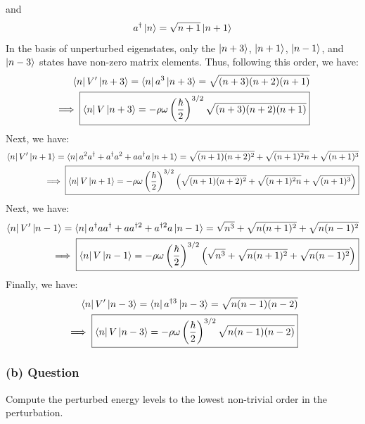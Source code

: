 \documentclass{article}
\begin{document}
and
\begin{equation}
    a^\dagger\ket{n} = \sqrt{n+1}\ket{n+1}
\end{equation}
In the basis of unperturbed eigenstates, only the $\ket{n+3}$, $\ket{n+1}$, $\ket{n-1}$, and $\ket{n-3}$ states have non-zero matrix elements. Thus, following this order, we have:
\begin{align}
    \bra{n}V'\ket{n+3} = \bra{n}a^3\ket{n+3} = \sqrt{(n+3)(n+2)(n+1)} \\ \implies \boxed{\bra{n}V\ket{n+3} = -\rho \omega \left(\frac{\hbar}{2}\right)^{3/2} \sqrt{(n+3)(n+2)(n+1)}} \\
\end{align}
Next, we have:
\begin{align}
    \bra{n}V'\ket{n+1} = \bra{n}a^2a^\dagger+a^{\dagger}a^2+aa^{\dagger}a\ket{n+1} = \sqrt{(n+1)(n+2)^2} + \sqrt{(n+1)^2n} + \sqrt{(n+1)^3}\\
    \implies \boxed{\bra{n}V\ket{n+1} = -\rho \omega \left(\frac{\hbar}{2}\right)^{3/2} \left( \sqrt{(n+1)(n+2)^2} + \sqrt{(n+1)^2n} + \sqrt{(n+1)^3} \right)} \\
\end{align}
Next, we have:
\begin{align}
    \bra{n}V'\ket{n-1} = \bra{n}a^{\dagger}aa^{\dagger}+aa^{\dagger 2}+a^{\dagger 2}a\ket{n-1} = \sqrt{n^3} + \sqrt{n(n+1)^2} + \sqrt{n(n-1)^2}\\ 
    \implies \boxed{\bra{n}V\ket{n-1} = -\rho \omega \left(\frac{\hbar}{2}\right)^{3/2} \left( \sqrt{n^3} + \sqrt{n(n+1)^2} + \sqrt{n(n-1)^2} \right)} \\
\end{align}
Finally, we have:
\begin{align}
    \bra{n}V'\ket{n-3} = \bra{n}a^{\dagger 3}\ket{n-3} = \sqrt{n(n-1)(n-2)} \\ \implies \boxed{\bra{n}V\ket{n-3} = -\rho \omega \left(\frac{\hbar}{2}\right)^{3/2} \sqrt{n(n-1)(n-2)}} \\
\end{align}
\subsubsection*{(b) Question}
Compute the perturbed energy levels to the lowest non-trivial order in the perturbation.
\end{document}
